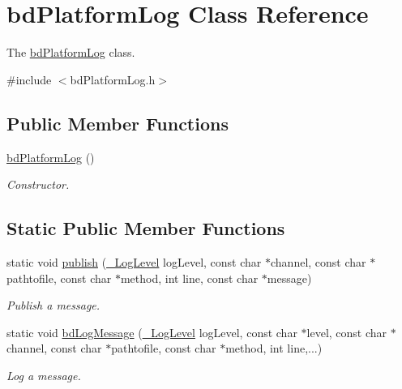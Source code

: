 \hypertarget{classbd_platform_log}{\section{bd\-Platform\-Log Class Reference}
\label{classbd_platform_log}
}


The \hyperlink{classbd_platform_log}{bd\-Platform\-Log} class.  




{\ttfamily \#include $<$bd\-Platform\-Log.\-h$>$}

\subsection*{Public Member Functions}
\begin{DoxyCompactItemize}
\item 
\hyperlink{classbd_platform_log_afcd51cbc6c5213eeb43a94f9e3912327}{bd\-Platform\-Log} ()
\begin{DoxyCompactList}\small\item\em Constructor. \end{DoxyCompactList}\end{DoxyCompactItemize}
\subsection*{Static Public Member Functions}
\begin{DoxyCompactItemize}
\item 
static void \hyperlink{classbd_platform_log_a3bee73938674ac56d954aabdaa370432}{publish} (\hyperlink{bd_platform_log_8h_a7d9d20bfc2dbfc95773beb480657d5d1}{\-\_\-\-Log\-Level} log\-Level, const char $\ast$channel, const char $\ast$pathtofile, const char $\ast$method, int line, const char $\ast$message)
\begin{DoxyCompactList}\small\item\em Publish a message. \end{DoxyCompactList}\item 
static void \hyperlink{classbd_platform_log_abddf5b49c53721a9af03a9465284e844}{bd\-Log\-Message} (\hyperlink{bd_platform_log_8h_a7d9d20bfc2dbfc95773beb480657d5d1}{\-\_\-\-Log\-Level} log\-Level, const char $\ast$level, const char $\ast$channel, const char $\ast$pathtofile, const char $\ast$method, int line,...)
\begin{DoxyCompactList}\small\item\em Log a message. \end{DoxyCompactList}\end{DoxyCompactItemize}


